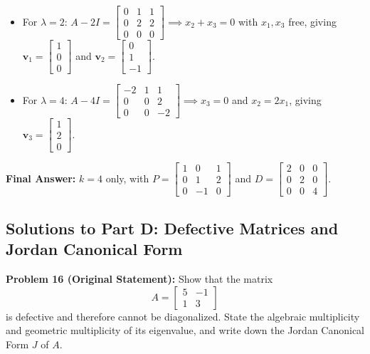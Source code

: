 \documentclass[11pt, letterpaper]{article}
\theoremstyle{definition}
\theoremstyle{remark}
\begin{document}
\begin{itemize}
    \item For $\lambda = 2$: $A - 2I = \begin{bmatrix} 0 & 1 & 1 \\ 0 & 2 & 2 \\ 0 & 0 & 0 \end{bmatrix} \implies x_{2} + x_{3} = 0$ with $x_{1}, x_{3}$ free, giving $\mathbf{v}_{1} = \begin{bmatrix} 1 \\ 0 \\ 0 \end{bmatrix}$ and $\mathbf{v}_{2} = \begin{bmatrix} 0 \\ 1 \\ -1 \end{bmatrix}$.
    \item For $\lambda = 4$: $A - 4I = \begin{bmatrix} -2 & 1 & 1 \\ 0 & 0 & 2 \\ 0 & 0 & -2 \end{bmatrix} \implies x_{3} = 0$ and $x_{2} = 2x_{1}$, giving $\mathbf{v}_{3} = \begin{bmatrix} 1 \\ 2 \\ 0 \end{bmatrix}$.
\end{itemize}
\textbf{Final Answer:} $k = 4$ only, with $P = \begin{bmatrix} 1 & 0 & 1 \\ 0 & 1 & 2 \\ 0 & -1 & 0 \end{bmatrix}$ and $D = \begin{bmatrix} 2 & 0 & 0 \\ 0 & 2 & 0 \\ 0 & 0 & 4 \end{bmatrix}$.

\subsection{Solutions to Part D: Defective Matrices and Jordan Canonical Form}

\textbf{Problem 16 (Original Statement):}
Show that the matrix
\[
A = \begin{bmatrix} 5 & -1 \\ 1 & 3 \end{bmatrix}
\]
is defective and therefore cannot be diagonalized. State the algebraic multiplicity and geometric multiplicity of its eigenvalue, and write down the Jordan Canonical Form $J$ of $A$.
\end{document}

